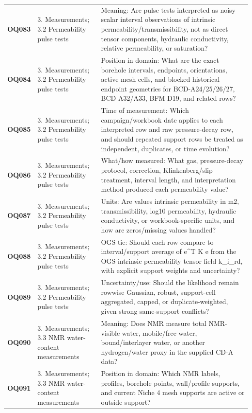 \begin{longtable}{@{}L{0.10\textwidth} L{0.23\textwidth} L{0.59\textwidth}@{}}
\addlinespace[0.16em]
\textbf{OQ083} & 3. Measurements; 3.2 Permeability pulse tests & Meaning: Are pulse tests interpreted as noisy scalar interval observations of intrinsic permeability/transmissibility, not as direct tensor components, hydraulic conductivity, relative permeability, or saturation?\\
\addlinespace[0.16em]
\textbf{OQ084} & 3. Measurements; 3.2 Permeability pulse tests & Position in domain: What are the exact borehole intervals, endpoints, orientations, active mesh cells, and blocked historical endpoint geometries for BCD-A24/25/26/27, BCD-A32/A33, BFM-D19, and related rows?\\
\addlinespace[0.16em]
\textbf{OQ085} & 3. Measurements; 3.2 Permeability pulse tests & Time of measurement: Which campaign/workbook date applies to each interpreted row and raw pressure-decay row, and should repeated support rows be treated as independent, duplicates, or time evolution?\\
\addlinespace[0.16em]
\textbf{OQ086} & 3. Measurements; 3.2 Permeability pulse tests & What/how measured: What gas, pressure-decay protocol, correction, Klinkenberg/slip treatment, interval length, and interpretation method produced each permeability value?\\
\addlinespace[0.16em]
\textbf{OQ087} & 3. Measurements; 3.2 Permeability pulse tests & Units: Are values intrinsic permeability in m2, transmissibility, log10 permeability, hydraulic conductivity, or workbook-specific units, and how are zeros/missing values handled?\\
\addlinespace[0.16em]
\textbf{OQ088} & 3. Measurements; 3.2 Permeability pulse tests & OGS tie: Should each row compare to interval/support average of e\textasciicircum{}T K e from the OGS intrinsic permeability tensor field k\_i\_rd, with explicit support weights and uncertainty?\\
\addlinespace[0.16em]
\textbf{OQ089} & 3. Measurements; 3.2 Permeability pulse tests & Uncertainty/use: Should the likelihood remain rowwise Gaussian, robust, support-cell aggregated, capped, or duplicate-weighted, given strong same-support conflicts?\\
\addlinespace[0.16em]
\textbf{OQ090} & 3. Measurements; 3.3 NMR water-content measurements & Meaning: Does NMR measure total NMR-visible water, mobile/free water, bound/interlayer water, or another hydrogen/water proxy in the supplied CD-A data?\\
\addlinespace[0.16em]
\textbf{OQ091} & 3. Measurements; 3.3 NMR water-content measurements & Position in domain: Which NMR labels, profiles, borehole points, wall/profile supports, and current Niche 4 mesh supports are active or outside support?\\

\end{longtable}
